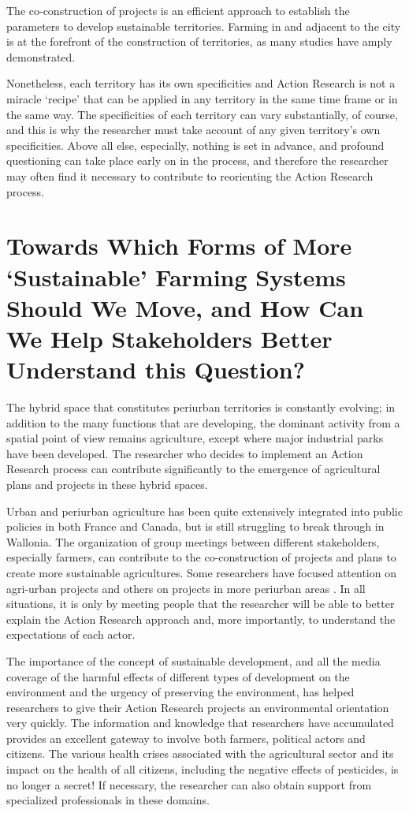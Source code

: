 \documentclass[10pt,a4paper]{article}
\begin{document}
\begin{multicols}{2}
The co-construction of projects is an efficient approach to establish the parameters to develop sustainable territories. Farming in and adjacent to the city is at the forefront of the construction of territories, as many studies have amply demonstrated.

Nonetheless, each territory has its own specificities and Action Research is not a miracle `recipe' that can be applied in any territory in the same time frame or in the same way. The specificities of each territory can vary substantially, of course, and this is why the researcher must take account of any given territory's own specificities. Above all else, especially, nothing is set in advance, and profound questioning can take place early on in the process, and therefore the researcher may often find it necessary to contribute to reorienting the Action Research process.

\section{Towards Which Forms of More `Sustainable' Farming Systems Should We Move, and How Can We Help Stakeholders Better Understand this Question?}
\noindent The hybrid space that constitutes periurban territories is constantly evolving; in addition to the many functions that are developing, the dominant activity from a spatial point of view remains agriculture, except where major industrial parks have been developed. The researcher who decides to implement an Action Research process can contribute significantly to the emergence of agricultural plans and projects in these hybrid spaces.

Urban and periurban agriculture has been quite extensively integrated into public policies in both France and Canada, but is still struggling to break through in Wallonia. The organization of group meetings between different stakeholders, especially farmers, can contribute to the co-construction of projects and plans to create more sustainable agricultures. Some researchers have focused attention on agri-urban projects \citep{r19, r20} and others on projects in more periurban areas \citep{r06}. In all situations, it is only by meeting people that the researcher will be able to better explain the Action Research approach and, more importantly, to understand the expectations of each actor.

The importance of the concept of sustainable development, and all the media coverage of the harmful effects of different types of development on the environment and the urgency of preserving the environment, has helped researchers to give their Action Research projects an environmental orientation very quickly. The information and knowledge that researchers have accumulated provides an excellent gateway to involve both farmers, political actors and citizens. The various health crises associated with the agricultural sector and its impact on the health of all citizens, including the negative effects of pesticides, is no longer a secret! If necessary, the researcher can also obtain support from specialized professionals in these domains.


\end{multicols}
\end{document}
